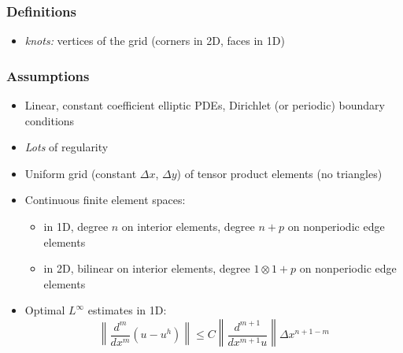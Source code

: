 \begin{frame}
    \frametitle{Definitions}
    \begin{itemize}
        \item \emph{knots:} vertices of the grid (corners in 2D, faces in 1D)
    \end{itemize}
\end{frame}

\begin{frame}
    \frametitle{Assumptions}
    \begin{itemize}
        \item Linear, constant coefficient elliptic PDEs, Dirichlet (or
              periodic) boundary conditions
              \pause
        \item \emph{Lots} of regularity
              \pause
        \item Uniform grid (constant \(\Delta x\), \(\Delta y\)) of tensor
              product elements (no triangles)
              \pause
        \item Continuous finite element spaces:
              \begin{itemize}
                  \item in 1D, degree \(n\) on interior elements, degree \(n +
                        p\) on nonperiodic edge elements
                  \item in 2D, bilinear on interior elements, degree \(1 \otimes
                        1 + p\) on nonperiodic edge elements
              \end{itemize}
              \pause
        \item Optimal \(L^\infty\) estimates in 1D:
              \begin{equation}
                  \left\|\dfrac{d^m}{dx^m}(u - u^h)\right\|
                  \leq C \left\|\dfrac{d^{m + 1}}{dx^{m + 1} u}\right\|
                  \Delta x^{n + 1- m}
              \end{equation}
    \end{itemize}
\end{frame}

